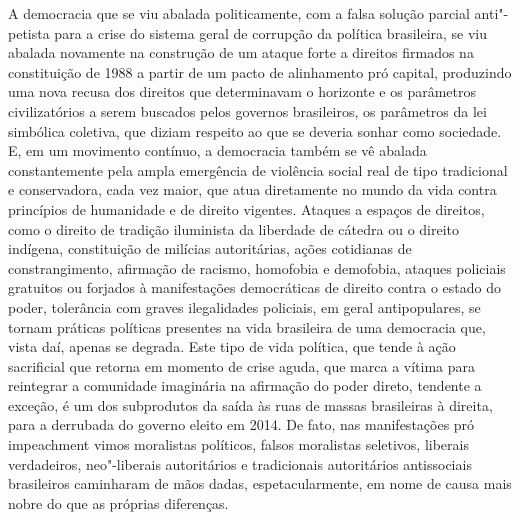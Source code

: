 A democracia que se viu abalada politicamente, com a falsa solução
parcial anti"-petista para a crise do sistema geral de corrupção da
política brasileira, se viu abalada novamente na construção de um ataque
forte a direitos firmados na constituição de 1988 a partir de um pacto
de alinhamento pró capital, produzindo uma nova recusa dos direitos que
determinavam o horizonte e os parâmetros civilizatórios a serem buscados
pelos governos brasileiros, os parâmetros da lei simbólica coletiva, que
diziam respeito ao que se deveria sonhar como sociedade. E, em um
movimento contínuo, a democracia também se vê abalada constantemente
pela ampla emergência de violência social real de tipo tradicional e
conservadora, cada vez maior, que atua diretamente no mundo da vida
contra princípios de humanidade e de direito vigentes. Ataques a espaços
de direitos, como o direito de tradição iluminista da liberdade de
cátedra ou o direito indígena, constituição de milícias autoritárias,
ações cotidianas de constrangimento, afirmação de racismo, homofobia e
demofobia, ataques policiais gratuitos ou forjados à manifestações
democráticas de direito contra o estado do poder, tolerância com graves
ilegalidades policiais, em geral antipopulares, se tornam práticas
políticas presentes na vida brasileira de uma democracia que, vista daí,
apenas se degrada. Este tipo de vida política, que tende à ação
sacrificial que retorna em momento de crise aguda, que marca a vítima
para reintegrar a comunidade imaginária na afirmação do poder direto,
tendente a exceção, é um dos subprodutos da saída às ruas de massas
brasileiras à direita, para a derrubada do governo eleito em 2014. De
fato, nas manifestações pró impeachment vimos moralistas políticos,
falsos moralistas seletivos, liberais verdadeiros, neo"-liberais
autoritários e tradicionais autoritários antissociais brasileiros
caminharam de mãos dadas, espetacularmente, em nome de causa mais nobre
do que as próprias diferenças.


